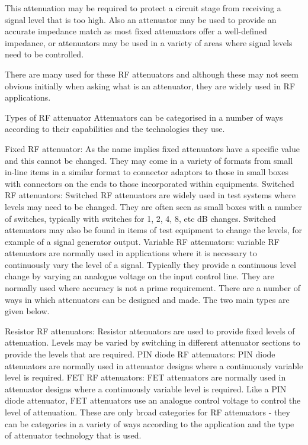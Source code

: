 This attenuation may be required to protect a circuit stage from receiving a signal level that is too high. Also an attenuator may be used to provide an accurate impedance match as most fixed attenuators offer a well-defined impedance, or attenuators may be used in a variety of areas where signal levels need to be controlled.

There are many used for these RF attenuators and although these may not seem obvious initially when asking what is an attenuator, they are widely used in RF applications.

Types of RF attenuator
Attenuators can be categorised in a number of ways according to their capabilities and the technologies they use.

Fixed RF attenuator:   As the name implies fixed attenuators have a specific value and this cannot be changed. They may come in a variety of formats from small in-line items in a similar format to connector adaptors to those in small boxes with connectors on the ends to those incorporated within equipments.
Switched RF attenuators:   Switched RF attenuators are widely used in test systems where levels may need to be changed. They are often seen as small boxes with a number of switches, typically with switches for 1, 2, 4, 8, etc dB changes. Switched attenuators may also be found in items of test equipment to change the levels, for example of a signal generator output.
Variable RF attenuators:   variable RF attenuators are normally used in applications where it is necessary to continuously vary the level of a signal. Typically they provide a continuous level change by varying an analogue voltage on the input control line. They are normally used where accuracy is not a prime requirement.
There are a number of ways in which attenuators can be designed and made. The two main types are given below.

Resistor RF attenuators:   Resistor attenuators are used to provide fixed levels of attenuation. Levels may be varied by switching in different attenuator sections to provide the levels that are required.
PIN diode RF attenuators:   PIN diode attenuators are normally used in attenuator designs where a continuously variable level is required.
FET RF attenuators:   FET attenuators are normally used in attenuator designs where a continuously variable level is required. Like a PIN diode attenuator, FET attenuators use an analogue control voltage to control the level of attenuation.
These are only broad categories for RF attenuators - they can be categories in a variety of ways according to the application and the type of attenuator technology that is used.

